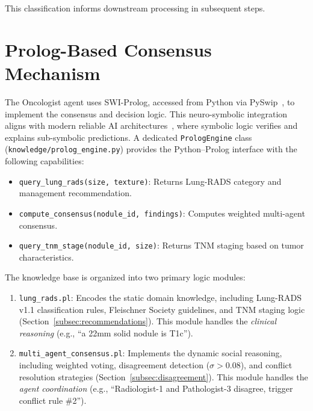 \documentclass[12pt]{article}
\begin{document}
This classification informs downstream processing in subsequent steps.


\section{Prolog-Based Consensus Mechanism}
\label{sec:prolog}

The Oncologist agent uses SWI-Prolog, accessed from Python via PySwip~\cite{pyswip_repo}, to implement the consensus and decision logic. This neuro-symbolic integration aligns with modern reliable AI architectures~\cite{garcez2019neurosymbolic}, where symbolic logic verifies and explains sub-symbolic predictions. A dedicated \texttt{PrologEngine} class (\texttt{knowledge/prolog\_engine.py}) provides the Python--Prolog interface with the following capabilities:

\begin{itemize}
    \item \texttt{query\_lung\_rads(size, texture)}: Returns Lung-RADS category and management recommendation.
    \item \texttt{compute\_consensus(nodule\_id, findings)}: Computes weighted multi-agent consensus.
    \item \texttt{query\_tnm\_stage(nodule\_id, size)}: Returns TNM staging based on tumor characteristics.
\end{itemize}

The knowledge base is organized into two primary logic modules:

\begin{enumerate}
    \item \texttt{lung\_rads.pl}: Encodes the static domain knowledge, including Lung-RADS v1.1 classification rules, Fleischner Society guidelines, and TNM staging logic (Section~\ref{subsec:recommendations}). This module handles the \emph{clinical reasoning} (e.g., ``a 22mm solid nodule is T1c'').
    \item \texttt{multi\_agent\_consensus.pl}: Implements the dynamic social reasoning, including weighted voting, disagreement detection ($\sigma > 0.08$), and conflict resolution strategies (Section~\ref{subsec:disagreement}). This module handles the \emph{agent coordination} (e.g., ``Radiologist-1 and Pathologist-3 disagree, trigger conflict rule \#2'').
\end{enumerate}
\end{document}
